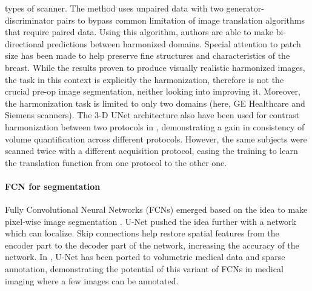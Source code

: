 \documentclass[preprint,12pt]{elsarticle}
\begin{document}
types of scanner. The method uses unpaired data with two generator-discriminator pairs to bypass common limitation of image translation algorithms that require paired data. Using this algorithm, authors are able to make bi-directional predictions between harmonized domains. Special attention to patch size has been made to help preserve fine structures and characteristics of the breast. While the results proven to produce visually realistic harmonized images, the task in this context is explicitly the harmonization, therefore is not the crucial pre-op image segmentation, neither looking into improving it. Moreover, the harmonization task is limited to only two domains (here, GE Healthcare and Siemens scanners). The 3-D UNet architecture also have been used for contrast harmonization between two protocols in \cite{dewey2019deepharmony}, demonstrating a gain in consistency of volume quantification across different protocols. However, the same subjects were scanned twice with a different acquisition protocol, easing the training to learn the translation function from one protocol to the other one.


\paragraph{FCN for segmentation}
Fully Convolutional Neural Networks (FCNs) emerged based on the idea to make pixel-wise image segmentation \cite{Long_2015_CVPR}. U-Net \cite{Ronneberger2015} pushed the idea further with a network which can localize. Skip connections help restore spatial features from the encoder part to the decoder part of the network, increasing the accuracy of the network. In \cite{Cicek}, U-Net has been ported to volumetric medical data and sparse annotation, demonstrating the potential of this variant of FCNs in medical imaging where a few images can be annotated.
\end{document}
